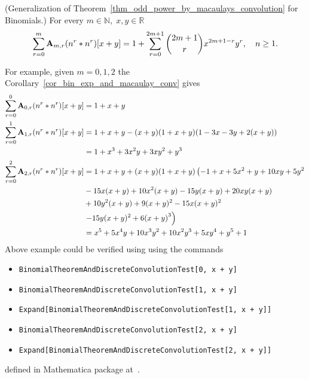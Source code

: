 \begin{cor}
    \label{cor_bin_exp_and_macaulay_conv}
    (Generalization of Theorem~\ref{thm_odd_power_by_macaulays_convolution} for Binomials.)
    For every $m\in\mathbb{N}, \; x,y\in\mathbb{R}$
    \begin{equation*}
        \sum_{r=0}^{m} {\mathbf{A}} \sb{m,r} (n \sp{r} \ast n \sp{r}) [x+y]
        =
        1 + \sum_{r=0}^{2m+1} \binom{2m+1}{r} x^{2m+1-r} y^r, \quad n\geq 1.
    \end{equation*}
\end{cor}
For example, given $m=0,1,2$ the Corollary~\ref{cor_bin_exp_and_macaulay_conv} gives
\begin{equation*}
    \begin{split}
        \sum_{r=0}^{0} {\mathbf{A}} \sb{0,r} (n \sp{r} \ast n \sp{r}) [x+y]
        &= 1 + x + y \\
        \sum_{r=0}^{1} {\mathbf{A}} \sb{1,r} (n \sp{r} \ast n \sp{r}) [x+y]
        &= 1 + x + y - (x + y) (1 + x + y) (1 - 3 x - 3 y + 2 (x + y)) \\
        &= 1 + x^3 + 3 x^2 y + 3 x y^2 + y^3\\
        \sum_{r=0}^{2} {\mathbf{A}} \sb{2,r} (n \sp{r} \ast n \sp{r}) [x+y]
        &=1 + x + y + (x + y) (1 + x + y) \left(-1 + x + 5 x^2 + y + 10 x y + 5 y^2\right. \\
        &-15 x (x + y) + 10 x^2 (x + y) - 15 y (x + y) + 20 x y (x + y) \\
        &+ 10 y^2 (x + y) +9 (x + y)^2 - 15 x (x + y)^2 \\
        &\left.-15 y (x + y)^{2} + 6 {(x + y)}^{3}\right) \\
        &=x^5 + 5 x^4 y + 10 x^3 y^2 + 10 x^2 y^3 + 5 x y^4 + y^5 + 1
    \end{split}
\end{equation*}
Above example could be verified using using the commands
\begin{itemize}
    \item \texttt{BinomialTheoremAndDiscreteConvolutionTest[0, x + y]}
    \item \texttt{BinomialTheoremAndDiscreteConvolutionTest[1, x + y]}
    \item \texttt{Expand[BinomialTheoremAndDiscreteConvolutionTest[1, x + y]]}
    \item \texttt{BinomialTheoremAndDiscreteConvolutionTest[2, x + y]}
    \item \texttt{Expand[BinomialTheoremAndDiscreteConvolutionTest[2, x + y]]}
\end{itemize}
defined in Mathematica package at~\cite{PK22Source}.

